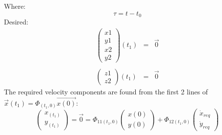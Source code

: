 \documentclass[11pt, a4paper]{article}
\begin{document}
Where:
\begin{equation*}
    \tau = t-t_0
\end{equation*}
Desired:
\begin{equation}
    \begin{matrix}
        \begin{pmatrix}
            x1\\
            y1\\
            x2\\
            y2
        \end{pmatrix}(t_1) & = & \vec{0} \\\\
        \begin{pmatrix}
            z1\\
            z2
        \end{pmatrix}(t_1) & = & \vec{0}
    \end{matrix}
\end{equation}
The required velocity components are found from the first 2 lines of $\vec{x}(t_1)=\Phi_(t_1,0)\vec{x(0)}$:
\begin{equation}
    \begin{pmatrix}
        x_{(t_1)}\\y_{(t_1)}
    \end{pmatrix} = \vec{0} = \Phi_{11(t_1, 0)}\begin{pmatrix}
        x(0)\\y(0)
    \end{pmatrix} + \Phi_{12(t_1,0)}\begin{pmatrix}
        \dot{x}_{req} \\
        \dot{y}_{req}
    \end{pmatrix}
\end{equation}
\end{document}
